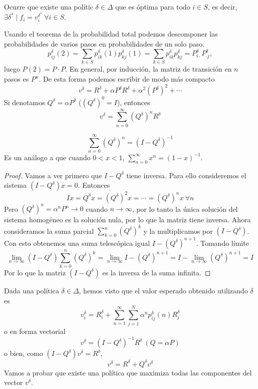 \documentclass[MIOP.tex]{subfiles}
\begin{document}
\begin{observacion}
Ocurre que existe una polític $\delta\in\Delta$ que es óptima para todo $i\in S$, es decir, $\exists \delta^*\mid f_i=v_i^{\delta^*}\ \forall i\in S$.
\end{observacion}
\begin{observacion}
Usando el teorema de la probabilidad total podemos descomponer las probabilidades de varios pasos en probabilidades de un solo paso.
$$p_{ij}^\delta(2)=\sum_{k\in S}p_{ik}^\delta(1)p_{kj}^\delta(1)=\sum_{k\in S}p_{ik}^\delta p_{kj}^\delta=P^\delta_{i\cdot}P^\delta_{\cdot j},$$
luego $P(2)=P\cdot P$. En general, por inducción, la matriz de transición en $n$ pasos es $P^n$. De esta forma podemos escribir de modo más compacto
$$v^\delta=R^\delta+ \alpha P^\delta R^\delta +\alpha^2 (P^\delta)^2+\cdots$$
Si denotamos $Q^\delta=\alpha P^\delta$ ($(Q^\delta)^0=I$), entonces
$$v^\delta=\sum_{n=0}^\infty (Q^\delta)^n R^\delta$$
\end{observacion}

\begin{lemma}
$$\sum_{n=0}^\infty (Q^\delta)^n=(I-Q^\delta)^{-1}$$
Es un análogo a que cuando $0<x<1$, $\sum_{n=0}^\infty x^n=(1-x)^{-1}$. 
\end{lemma}
\begin{proof}
Vamos a ver primero que $I-Q^\delta$ tiene inversa. Para ello consideremos el sistema $(I-Q^\delta)x=0$. Entonces
$$Ix=Q^\delta x=(Q^\delta)^2x=\cdots=(Q^\delta)^nx\ \forall n$$
Pero $(Q^\delta)^n=\alpha^n P^n\to 0$ cuando $n\to\infty$, por lo tanto la única solución del sistema homogéneo es la solución nula, por lo que la matriz tiene inversa. Ahora consideramos la suma parcial $\sum_{k=0}^n (Q^\delta)^k$ y la multiplicamos por $(I-Q^\delta)$. Con esto obtenemos una suma telescópica igual $I-(Q^\delta)^{n+1}$. Tomando límite
$$\lim_{n\to\infty}(I-Q^\delta)\sum_{k=0}^n (Q^\delta)^k=\lim_{n\to\infty}I-(Q^\delta)^{n+1}=I-\lim_{n\to\infty}(Q^\delta)^{n+1}=I$$
Por lo que la matriz $(I-Q^\delta)$ es la inversa de la suma infinita.
\end{proof}

Dada una política $\delta\in\Delta$, hemos visto que el valor esperado obtenido utilizando $\delta$ es
$$v_i^\delta=R^\delta_i+\sum_{n=1}^\infty\sum_{j=1}^N\alpha^n p_{ij}^\delta(n) R_j^\delta$$
o en forma vectorial
$$v^\delta=(I-Q^\delta)^{-1}R^\delta\ (Q=\alpha P)$$
o bien, como $(I-Q^\delta)v^\delta=R^\delta$,
$$v^\delta=R^\delta+Q^\delta v^\delta$$
Vamos a probar que existe una política que maximiza todas las componentes del vector $v^\delta$.
\end{document}
